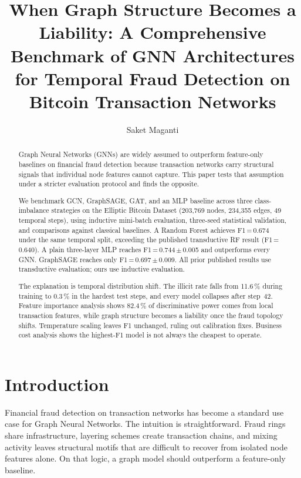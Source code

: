 \documentclass[runningheads]{llncs}
\title{When Graph Structure Becomes a Liability: A Comprehensive Benchmark of
GNN Architectures for Temporal Fraud Detection on Bitcoin Transaction Networks}
\author{Saket Maganti}
\institute{School of Computer Science and Engineering, VIT-AP University,
Amaravati, Andhra Pradesh 522237, India\\
\email{saket.maganti@vitap.ac.in}\\
\url{https://github.com/Saket-Maganti/gnn-fraud}}
\begin{document}
\maketitle

\begin{abstract}
Graph Neural Networks (GNNs) are widely assumed to outperform feature-only
baselines on financial fraud detection because transaction networks carry
structural signals that individual node features cannot capture. This paper
tests that assumption under a stricter evaluation protocol and finds the
opposite.

We benchmark GCN, GraphSAGE, GAT, and an MLP baseline across three
class-imbalance strategies on the Elliptic Bitcoin Dataset (203,769 nodes,
234,355 edges, 49 temporal steps), using inductive mini-batch evaluation,
three-seed statistical validation, and comparisons against classical baselines.
A Random Forest achieves F1\,=\,0.674 under the same temporal split,
exceeding the published transductive RF result (F1\,=\,0.640). A plain
three-layer MLP reaches F1\,=\,0.744\,$\pm$\,0.005 and outperforms every GNN.
GraphSAGE reaches only F1\,=\,0.697\,$\pm$\,0.009. All prior published results
use transductive evaluation; ours use inductive evaluation.

The explanation is temporal distribution shift. The illicit rate falls from
11.6\,\% during training to 0.3\,\% in the hardest test steps, and every
model collapses after step~42. Feature importance analysis shows 82.4\,\% of
discriminative power comes from local transaction features, while graph
structure becomes a liability once the fraud topology shifts. Temperature
scaling leaves F1 unchanged, ruling out calibration fixes. Business cost
analysis shows the highest-F1 model is not always the cheapest to operate.

\end{abstract}

\section{Introduction}

Financial fraud detection on transaction networks has become a standard use case
for Graph Neural Networks. The intuition is straightforward. Fraud rings share
infrastructure, layering schemes create transaction chains, and mixing activity
leaves structural motifs that are difficult to recover from isolated node
features alone. On that logic, a graph model should outperform a feature-only
baseline.
\end{document}
